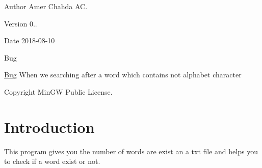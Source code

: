 \begin{DoxyAuthor}{Author}
Amer Chahda AC.
\end{DoxyAuthor}
\begin{DoxyVersion}{Version}
0..
\end{DoxyVersion}
\begin{DoxyDate}{Date}
2018-\/08-\/10
\end{DoxyDate}
\begin{DoxyRefDesc}{Bug}
\item[\mbox{\hyperlink{bug__bug000001}{Bug}}]When we searching after a word which contains not alphabet character\end{DoxyRefDesc}


\begin{DoxyCopyright}{Copyright}
Min\+GW Public License.
\end{DoxyCopyright}
\hypertarget{index_intro_section}{}\section{Introduction}\label{index_intro_section}
This program gives you the number of words are exist an a txt file and helps you to check if a word exist or not. 
